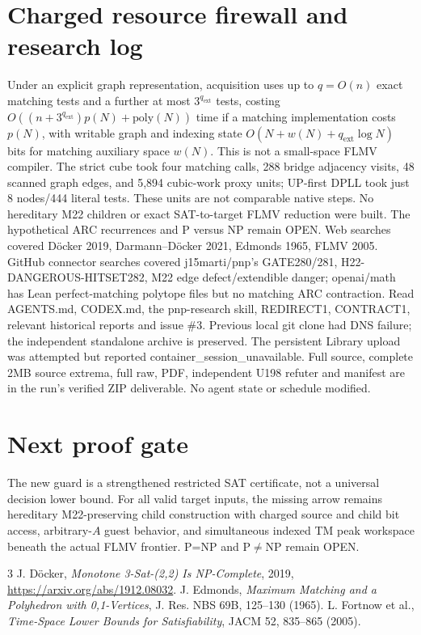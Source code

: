 \documentclass[11pt]{article}
\begin{document}
\section{Charged resource firewall and research log}
Under an explicit graph representation, acquisition uses up to $q=O(n)$ exact matching tests and a further at most $3^{q_{\mathrm{ext}}}$ tests, costing $O((n+3^{q_{\mathrm{ext}}})p(N)+\mathrm{poly}(N))$ time if a matching implementation costs $p(N)$, with writable graph and indexing state $O(N+w(N)+q_{\mathrm{ext}}\log N)$ bits for matching auxiliary space $w(N)$. This is not a small-space FLMV compiler. The strict cube took four matching calls, 288 bridge adjacency visits, 48 scanned graph edges, and 5,894 cubic-work proxy units; UP-first DPLL took just 8 nodes/444 literal tests. These units are not comparable native steps. No hereditary M22 children or exact SAT-to-target FLMV reduction were built. The hypothetical ARC recurrences and P versus NP remain OPEN.
Web searches covered D\"ocker 2019, Darmann--D\"ocker 2021, Edmonds 1965, FLMV 2005. GitHub connector searches covered j15marti/pnp's GATE280/281, H22-DANGEROUS-HITSET282, M22 edge defect/extendible danger; openai/math has Lean perfect-matching polytope files but no matching ARC contraction. Read AGENTS.md, CODEX.md, the pnp-research skill, REDIRECT1, CONTRACT1, relevant historical reports and issue \#3. Previous local git clone had DNS failure; the independent standalone archive is preserved. The persistent Library upload was attempted but reported container_session_unavailable. Full source, complete 2MB source extrema, full raw, PDF, independent U198 refuter and manifest are in the run's verified ZIP deliverable. No agent state or schedule modified.
\section{Next proof gate}
The new guard is a strengthened restricted SAT certificate, not a universal decision lower bound. For all valid target inputs, the missing arrow remains hereditary M22-preserving child construction with charged source and child bit access, arbitrary-$A$ guest behavior, and simultaneous indexed TM peak workspace beneath the actual FLMV frontier. P=NP and P$\ne$NP remain OPEN.
\begin{thebibliography}{3}
 J. D\"ocker, \emph{Monotone 3-Sat-(2,2) Is NP-Complete}, 2019, \url{https://arxiv.org/abs/1912.08032}.
 J. Edmonds, \emph{Maximum Matching and a Polyhedron with 0,1-Vertices}, J. Res. NBS 69B, 125--130 (1965).
 L. Fortnow et al., \emph{Time-Space Lower Bounds for Satisfiability}, JACM 52, 835--865 (2005).
\end{thebibliography}
\end{document}
